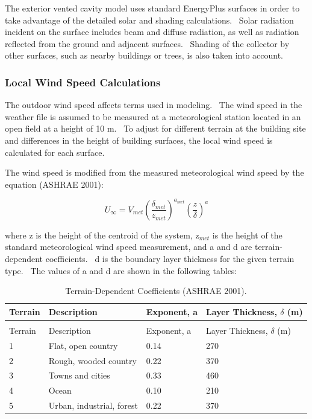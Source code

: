The exterior vented cavity model uses standard EnergyPlus surfaces in order to take advantage of the detailed solar and shading calculations.~ Solar radiation incident on the surface includes beam and diffuse radiation, as well as radiation reflected from the ground and adjacent surfaces.~ Shading of the collector by other surfaces, such as nearby buildings or trees, is also taken into account.

\subsubsection{Local Wind Speed Calculations}\label{local-wind-speed-calculations}

The outdoor wind speed affects terms used in modeling.~ The wind speed in the weather file is assumed to be measured at a meteorological station located in an open field at a height of 10 m.~ To adjust for different terrain at the building site and differences in the height of building surfaces, the local wind speed is calculated for each surface.

The wind speed is modified from the measured meteorological wind speed by the equation (ASHRAE 2001):

\begin{equation}
{U_\infty } = {V_{met}}{\left( {\frac{{{\delta_{met}}}}{{{z_{met}}}}} \right)^{{a_{met}}}}{\left( {\frac{z}{\delta }} \right)^a}
\end{equation}

where z is the height of the centroid of the system, z\(_{met}\) is the height of the standard meteorological wind speed measurement, and a and d are terrain-dependent coefficients.~ d is the boundary layer thickness for the given terrain type.~ The values of a and d are shown in the following tables:

\begin{longtable}[c]{@{}llll@{}}
\caption{Terrain-Dependent Coefficients (ASHRAE 2001). \label{table:terrain-dependent-coefficients-ashrae-2001.}} \tabularnewline
\toprule 
Terrain & Description & Exponent, a & Layer Thickness, $\delta$ (m) \tabularnewline
\midrule
\endfirsthead

\caption[]{Terrain-Dependent Coefficients (ASHRAE 2001).} \tabularnewline
\toprule 
Terrain & Description & Exponent, a & Layer Thickness, $\delta$ (m) \tabularnewline
\midrule
\endhead

1 & Flat, open country & 0.14 & 270 \tabularnewline
2 & Rough, wooded country & 0.22 & 370 \tabularnewline
3 & Towns and cities & 0.33 & 460 \tabularnewline
4 & Ocean & 0.10 & 210 \tabularnewline
5 & Urban, industrial, forest & 0.22 & 370 \tabularnewline
\bottomrule
\end{longtable}

